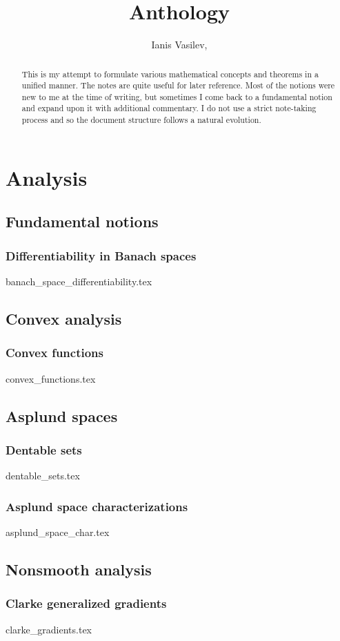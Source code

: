 \documentclass[numbers=endperiod, bibliography=totocnumbered]{scrartcl}
\title{Anthology}
\author{Ianis Vasilev, \Email{ianis@ivasilev.net}}
\date{}
\begin{document}
\maketitle

\begin{abstract}
  This is my attempt to formulate various mathematical concepts and theorems in a unified manner. The notes are quite useful for later reference. Most of the notions were new to me at the time of writing, but sometimes I come back to a fundamental notion and expand upon it with additional commentary. I do not use a strict note-taking process and so the document structure follows a natural evolution.
\end{abstract}

\tableofcontents

\section{Analysis}\label{sec:analysis}
\subsection{Fundamental notions}\label{sec:analysis/fundamental_notions}
\subsubsection{Differentiability in Banach spaces}\label{sec:banach_space_differentiability}
{banach_space_differentiability.tex}

\subsection{Convex analysis}\label{sec:convex_analysis}
\subsubsection{Convex functions}\label{sec:convex_functions}
{convex_functions.tex}

\subsection{Asplund spaces}\label{sec:asplund_spaces}
\subsubsection{Dentable sets}\label{sec:dentable_sets}
{dentable_sets.tex}
\subsubsection{Asplund space characterizations}\label{sec:asplund_space_char}
{asplund_space_char.tex}

\subsection{Nonsmooth analysis}\label{sec:nonsmooth_analysis}
\subsubsection{Clarke generalized gradients}\label{sec:clarke_gradients}
{clarke_gradients.tex}

\printbibliography
\end{document}
